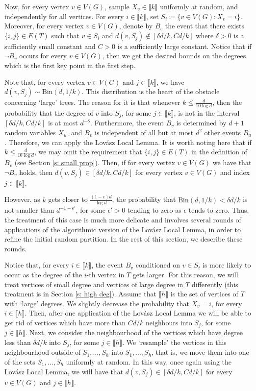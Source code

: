\documentclass[notitlepage]{scrartcl}
\newcommand{\br}[1]{\llbracket{#1}\rrbracket}
\begin{document}
Now, for every vertex $v \in V(G)$, sample $X_v\in \br{k}$ uniformly at random, and independently for all vertices. For every $i \in \br{k}$, set $S_i \coloneqq \{v \in V(G) \colon X_v = i\}$. Moreover, for every vertex $v \in V(G)$, denote by $B_v$ the event that there exists $\{i, j\} \in E(T)$ such that $v \in S_i$ and $d(v, S_j) \notin [\delta d/k, C d/k]$ where $\delta>0$ is a sufficiently small constant and $C>0$ is a sufficiently large constant. Notice that if $\neg B_v$ occurs for every $v \in V(G)$, then we get the desired bounds on the degrees which is the first key point in the first step.

Note that, for every vertex $v \in V(G)$ and $j \in \br{k}$, we have $d(v, S_j) \sim \text{Bin}\left(d, 1/k\right)$. This distribution is the heart of the obstacle concerning `large' trees. The reason for it is that whenever $k \le \frac{d}{10\log d}$, then the probability that the degree of $v$ into $S_j$, for some $j \in \br{k}$, is not in the interval $[\delta d/k, C d/k]$ is at most $d^{-8}$. Furthermore, the event $B_v$ is determined by $d+1$ random variables $X_u$, and $B_v$ is independent of all but at most $d^2$ other events $B_u$. Therefore, we can apply the Lov\'asz Local Lemma. It is worth noting here that if $k\le \frac{d}{10\log d}$, we may omit the requirement that $\{i, j\} \in E(T)$ in the definition of $B_v$ (see Section \ref{s: small prop}). Then, if for every vertex $v \in V(G)$ we have that $\neg B_v$ holds, then $d(v, S_j) \in [\delta d/k, C d/k]$ for every vertex $v \in V(G)$ and index $j \in \br{k}$. %

However, as $k$ gets closer to $\frac{(1-\epsilon)d}{\log d}$, the probability that $\text{Bin}\left(d, 1/k\right) < \delta d/k$ is not smaller than $d^{-1-\epsilon'}$, for some $\epsilon' > 0$ tending to zero as $\epsilon$ tends to zero. Thus, the treatment of this case is much more delicate and involves several rounds of applications of the algorithmic version of the Lov\'asz Local Lemma, in order to refine the initial random partition. In the rest of this section, we describe these rounds.

Notice that, for every $i \in \br{k}$, the event $B_v$ conditioned on $v \in S_i$ is more likely to occur as the degree of the $i$-th vertex in $T$ gets larger. For this reason, we will treat vertices of small degree and vertices of large degree in $T$ differently (this treatment is in Section \ref{s: high deg}). Assume that $\br{h}$ is the set of vertices of $T$ with `large' degrees. We slightly decrease the probability that $X_v = i$, for every $i \in \br{h}$. Then, after one application of the Lov\'asz Local Lemma we will be able to get rid of vertices which have more than $C d/k$ neighbours into $S_j$, for some $j \in \br{h}$. Next, we consider the neighbourhood of the vertices which have degree less than $\delta d/k$ into $S_j$, for some $j \in \br{h}$. We `resample' the vertices in this neighbourhood outside of $S_1,\ldots, S_h$ into $S_1, \dots, S_h$, that is, we move them into one of the sets $S_1,\ldots, S_h$ uniformly at random. In this way, once again using the Lov\'asz Local Lemma, we will have that $d(v, S_j) \in [\delta d/k, C d/k]$ for every $v \in V(G)$ and $j \in \br{h}$.
\end{document}
